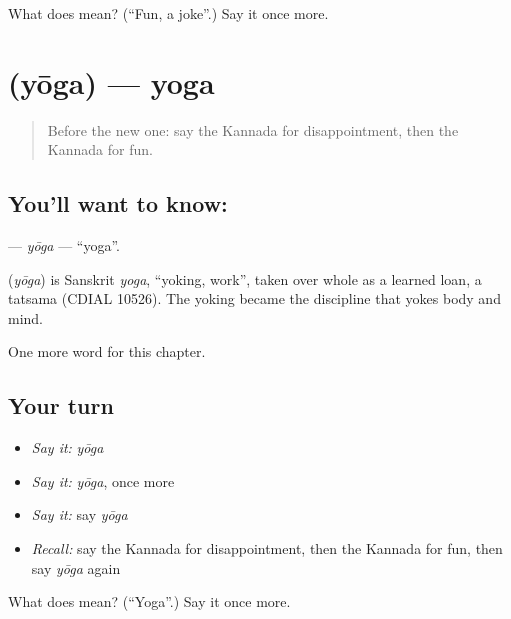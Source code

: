 \begin{tcolorbox}[breakable,colback=teal!4,colframe=teal!35!black,title={Before you move on}]
What does  mean? (\textquotedblleft{}Fun, a joke\textquotedblright{}.) Say it once more.
\end{tcolorbox}
\section[\texorpdfstring{\kn{ಯೋಗ} (yōga)}{ಯೋಗ (yōga)}]{ (yōga) — yoga}

\label{lesson:KA-C209-yoga}



\begin{quote}
Before the new one: say the Kannada for disappointment, then the Kannada for fun.
\end{quote}

\subsection*{You'll want to know: }
\textbf{} — \emph{yōga} — \textquotedblleft{}yoga\textquotedblright{}.

\begin{cousinweb}
\textbf{} (\emph{yōga}) is Sanskrit \emph{yoga}, \textquotedblleft{}yoking, work\textquotedblright{}, taken over whole as a learned loan, a tatsama (CDIAL 10526). The yoking became the discipline that yokes body and mind.
\end{cousinweb}

\begin{grammarlens}[title={What you've built}]
One more word for this chapter.
\end{grammarlens}

\subsection*{Your turn}
\begin{itemize}
\raggedright
  \item \emph{Say it:} \emph{yōga}
  \item \emph{Say it:} \emph{yōga}, once more
  \item \emph{Say it:} say \emph{yōga}
  \item \emph{Recall:} say the Kannada for disappointment, then the Kannada for fun, then say \emph{yōga} again
\end{itemize}

\begin{tcolorbox}[breakable,colback=teal!4,colframe=teal!35!black,title={Before you move on}]
What does  mean? (\textquotedblleft{}Yoga\textquotedblright{}.) Say it once more.
\end{tcolorbox}
